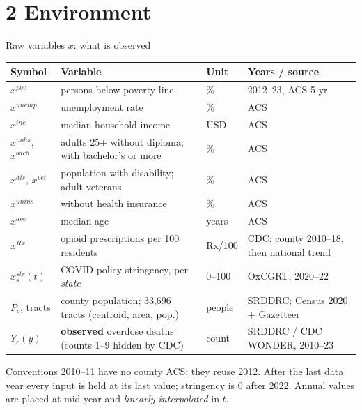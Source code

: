 ﻿\documentclass[9pt,aspectratio=169]{beamer}
\begin{document}
\section{2 Environment}
\begin{frame}{Raw variables $x$: what is observed}
 \footnotesize
 \renewcommand{\arraystretch}{1.08}
 \begin{tabular}{@{}l p{6.6cm} l p{4.2cm}@{}}
 \toprule
 Symbol & Variable & Unit & Years / source\\\midrule
 $x^{pov}$ & persons below poverty line & \% & 2012--23, ACS 5-yr\\
 $x^{unemp}$ & unemployment rate & \% & ACS\\
 $x^{inc}$ & median household income & USD & ACS\\
 $x^{nohs}$, $x^{bach}$ & adults 25+ without diploma; with bachelor's or more & \% & ACS\\
 $x^{dis}$, $x^{vet}$ & population with disability; adult veterans & \% & ACS\\
 $x^{unins}$ & without health insurance & \% & ACS\\
 $x^{age}$ & median age & years & ACS\\
 $x^{Rx}$ & opioid prescriptions per 100 residents & Rx/100 & CDC: county 2010--18, then national trend\\
 $x^{str}_s(t)$ & COVID policy stringency, per \emph{state} & 0--100 & OxCGRT, 2020--22\\
 $P_c$, tracts & county population; 33{,}696 tracts (centroid, area, pop.) & people & SRDDRC; Census 2020 + Gazetteer\\
 $Y_c(y)$ & \textbf{observed} overdose deaths (counts 1--9 hidden by CDC) & count & SRDDRC / CDC WONDER, 2010--23\\
 \bottomrule
 \end{tabular}
 \vspace{4pt}
 \begin{block}{Conventions}\small
  2010--11 have no county ACS: they reuse 2012. After the last data year every input is held at its last value; stringency is $0$ after 2022. Annual values are placed at mid-year and \emph{linearly interpolated} in $t$.
 \end{block}
\end{frame}
\end{document}
